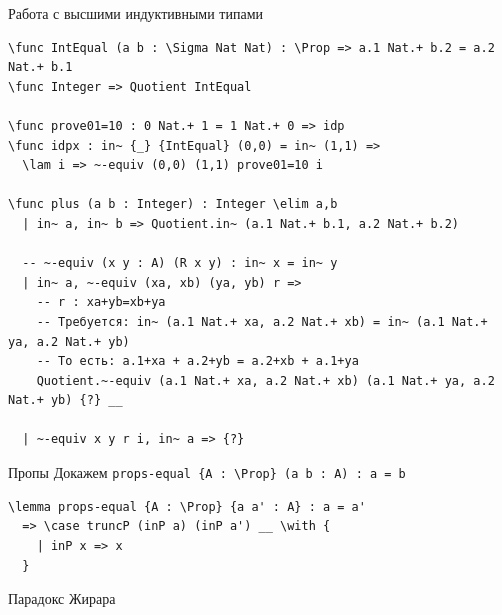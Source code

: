 \documentclass[aspectratio=169,dvipsnames,usenames]{beamer}
\begin{document}
\begin{frame}[fragile]{Работа с высшими индуктивными типами}
\footnotesize\begin{verbatim}
\func IntEqual (a b : \Sigma Nat Nat) : \Prop => a.1 Nat.+ b.2 = a.2 Nat.+ b.1
\func Integer => Quotient IntEqual

\func prove01=10 : 0 Nat.+ 1 = 1 Nat.+ 0 => idp
\func idpx : in~ {_} {IntEqual} (0,0) = in~ (1,1) =>
  \lam i => ~-equiv (0,0) (1,1) prove01=10 i

\func plus (a b : Integer) : Integer \elim a,b
  | in~ a, in~ b => Quotient.in~ (a.1 Nat.+ b.1, a.2 Nat.+ b.2)

  -- ~-equiv (x y : A) (R x y) : in~ x = in~ y
  | in~ a, ~-equiv (xa, xb) (ya, yb) r =>
    -- r : xa+yb=xb+ya
    -- Требуется: in~ (a.1 Nat.+ xa, a.2 Nat.+ xb) = in~ (a.1 Nat.+ ya, a.2 Nat.+ yb)
    -- То есть: a.1+xa + a.2+yb = a.2+xb + a.1+ya
    Quotient.~-equiv (a.1 Nat.+ xa, a.2 Nat.+ xb) (a.1 Nat.+ ya, a.2 Nat.+ yb) {?} __

  | ~-equiv x y r i, in~ a => {?}
\end{verbatim}
\end{frame}

\begin{frame}[fragile]{Пропы}
Докажем \verb!props-equal {A : \Prop} (a b : A) : a = b!

\begin{verbatim}
\lemma props-equal {A : \Prop} {a a' : A} : a = a'
  => \case truncP (inP a) (inP a') __ \with {
    | inP x => x
  }
\end{verbatim}

\end{frame}


\begin{frame}{}
\begin{center}
{\LARGE Парадокс Жирара}
\end{center}
\end{frame}
\end{document}
